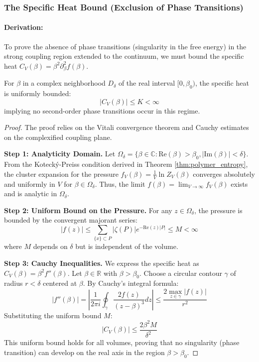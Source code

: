 \subsubsection{The Specific Heat Bound (Exclusion of Phase Transitions)}
\paragraph{Derivation:}
To prove the absence of phase transitions (singularity in the free energy) in the strong coupling region extended to the continuum, we must bound the specific heat $C_V(\beta) = \beta^2 \partial_\beta^2 f(\beta)$.

\begin{theorem}
    For $\beta$ in a complex neighborhood $D_\delta$ of the real interval $[0, \beta_0)$, the specific heat is uniformly bounded:
    \begin{equation}
        |C_V(\beta)| \le K < \infty
    \end{equation}
    implying no second-order phase transitions occur in this regime.
\end{theorem}
\begin{proof}
    The proof relies on the Vitali convergence theorem and Cauchy estimates on the complexified coupling plane.
    
    \textbf{Step 1: Analyticity Domain.}
    Let $\Omega_\delta = \{ \beta \in \mathbb{C} : \text{Re}(\beta) > \beta_0, |\text{Im}(\beta)| < \delta \}$.
    From the Koteck\'y-Preiss condition derived in Theorem \ref{thm:polymer_entropy}, the cluster expansion for the pressure $f_V(\beta) = \frac{1}{V} \ln Z_V(\beta)$ converges absolutely and uniformly in $V$ for $\beta \in \Omega_\delta$.
    Thus, the limit $f(\beta) = \lim_{V \to \infty} f_V(\beta)$ exists and is analytic in $\Omega_\delta$.
    
    \textbf{Step 2: Uniform Bound on the Pressure.}
    For any $z \in \Omega_\delta$, the pressure is bounded by the convergent majorant series:
    \begin{equation}
        |f(z)| \le \sum_{\{x\} \subset P} |\zeta(P)| e^{-\text{Re}(z) |P|} \le M < \infty
    \end{equation}
    where $M$ depends on $\delta$ but is independent of the volume.
    
    \textbf{Step 3: Cauchy Inequalities.}
    We express the specific heat as $C_V(\beta) = \beta^2 f''(\beta)$. Let $\beta \in \mathbb{R}$ with $\beta > \beta_0$. Choose a circular contour $\gamma$ of radius $r < \delta$ centered at $\beta$. By Cauchy's integral formula:
    \begin{equation}
        |f''(\beta)| = \left| \frac{1}{2\pi i} \oint_\gamma \frac{2 f(z)}{(z-\beta)^3} dz \right| \le \frac{2 \max_{z \in \gamma} |f(z)|}{r^2}
    \end{equation}
    Substituting the uniform bound $M$:
    \begin{equation}
        |C_V(\beta)| \le \frac{2 \beta^2 M}{\delta^2}
    \end{equation}
    This uniform bound holds for all volumes, proving that no singularity (phase transition) can develop on the real axis in the region $\beta > \beta_0$.
\end{proof}

